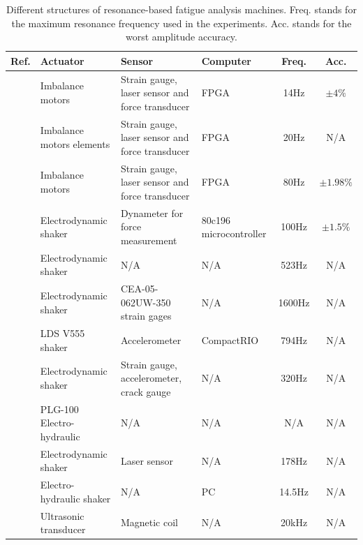 \documentclass[lettersize,journal]{IEEEtran}
\begin{document}
\begin{table}
    \centering
    \begin{tabular}{|l|l|l|l|c|c|} \hline
     Ref.   &  Actuator  & Sensor & Computer &  Freq. &  Acc. \\ \hline
     \cite{SCHRAMM2024117045}   & Imbalance motors &   Strain gauge, laser sensor and force transducer & FPGA  & 14Hz &    $\pm 4\%$\\ \hline
\cite{SCHNEIDER2018171}   & Imbalance motors elements  &  Strain gauge, laser sensor and force transducer & FPGA  & 20Hz  &   N/A \\  \hline

\cite{herrmann2018simulation_Thesis} & Imbalance motors &   Strain gauge, laser sensor and force transducer  & FPGA   & 80Hz &  $\pm 1.98\%$  \\    \hline

\cite{feng2003development_Japaneese}   & Electrodynamic shaker &  Dynameter for force measurement  & 80c196 microcontroller & 100Hz  &  $\pm 1.5\%$ \\ \hline

\cite{Su2014} & Electrodynamic shaker   & N/A & N/A &  523Hz & N/A   \\ \hline

\cite{George_2006} & Electrodynamic shaker    & CEA-05-062UW-350 strain gages & N/A  &  1600Hz & N/A \\ \hline
\cite{CESNIK20125370} & LDS V555 shaker  &  Accelerometer & CompactRIO &  794Hz &  N/A \\  \hline
\cite{gautrelet2020resonance} & Electrodynamic shaker &  Strain gauge, accelerometer,  crack gauge &  N/A & 320Hz & N/A  \\  \hline 


\cite{Ji_2010} &  PLG-100 Electro-hydraulic & N/A & N/A  &  N/A  & N/A  \\  \hline


\cite{DORANGA2024115368} & Electrodynamic shaker & Laser sensor & N/A  & 178Hz & N/A \\ \hline

\cite{Rouillard_2000} & Electro-hydraulic shaker & N/A & PC & 14.5Hz & N/A \\\hline

\cite{Stanzl01041980_fast_ultrasonic} & Ultrasonic transducer & Magnetic coil  & N/A  & 20kHz & N/A \\
           \hline
    \end{tabular}
    \vspace{0.1cm}
    \caption{Different structures of resonance-based fatigue analysis machines. Freq. stands for the maximum resonance frequency used in the experiments. Acc. stands for the worst amplitude accuracy.}
    \label{T_machine_types}
\end{table}
\end{document}

